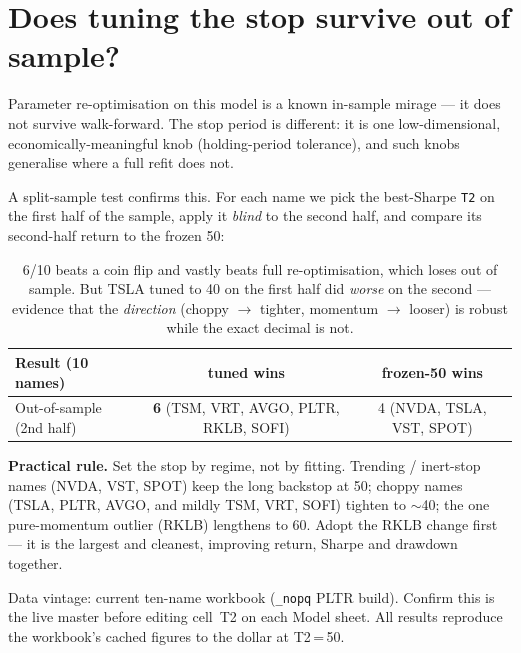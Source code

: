 \documentclass[11pt]{article}
\begin{document}
\section{Does tuning the stop survive out of sample?}

Parameter re-optimisation on this model is a known in-sample mirage --- it does not survive
walk-forward. The stop period is different: it is one low-dimensional, economically-meaningful
knob (holding-period tolerance), and such knobs generalise where a full refit does not.

A split-sample test confirms this. For each name we pick the best-Sharpe \texttt{T2} on the
first half of the sample, apply it \emph{blind} to the second half, and compare its
second-half return to the frozen 50:

\begin{table}[h]\centering\small
\renewcommand{\arraystretch}{1.15}
\begin{tabular}{lcc}
\toprule
\textbf{Result (10 names)} & \textbf{tuned wins} & \textbf{frozen-50 wins} \\
\midrule
Out-of-sample (2nd half) & \textbf{6} (TSM, VRT, AVGO, PLTR, RKLB, SOFI)
                         & 4 (NVDA, TSLA, VST, SPOT) \\
\bottomrule
\end{tabular}
\caption*{\footnotesize 6/10 beats a coin flip and vastly beats full re-optimisation, which
loses out of sample. But TSLA tuned to 40 on the first half did \emph{worse} on the second ---
evidence that the \emph{direction} (choppy $\to$ tighter, momentum $\to$ looser) is robust while
the exact decimal is not.}
\end{table}

\textbf{Practical rule.} Set the stop by regime, not by fitting. Trending / inert-stop names
(NVDA, VST, SPOT) keep the long backstop at 50; choppy names (TSLA, PLTR, AVGO, and mildly TSM,
VRT, SOFI) tighten to $\sim$40; the one pure-momentum outlier (RKLB) lengthens to 60. Adopt the
RKLB change first --- it is the largest and cleanest, improving return, Sharpe and drawdown
together.

\vfill
{\footnotesize\color{bcgrey} Data vintage: current ten-name workbook (\texttt{\_nopq} PLTR
build). Confirm this is the live master before editing cell~T2 on each Model sheet. All results
reproduce the workbook's cached figures to the dollar at T2\,=\,50.}
\end{document}
